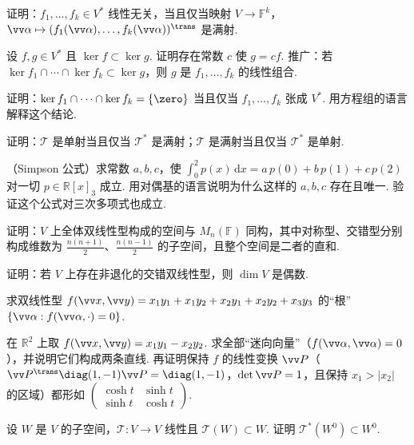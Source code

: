 {		\Bgroup
		\begin{exB}
			\item\label{ex:bil:B1} 证明：$f_1,\ldots,f_k\in V^*$ 线性无关，当且仅当映射 $V\to\mathbb{F}^k$，$\vv\alpha\mapsto(f_1(\vv\alpha),\ldots,f_k(\vv\alpha))^\trans$ 是满射.
			\item\label{ex:bil:B2} 设 $f,g\in V^*$ 且 $\ker f\subset\ker g$. 证明存在常数 $c$ 使 $g=cf$. 推广：若 $\ker f_1\cap\cdots\cap\ker f_k\subset\ker g$，则 $g$ 是 $f_1,\ldots,f_k$ 的线性组合.
			\item\label{ex:bil:B3} 证明：$\ker f_1\cap\cdots\cap\ker f_k=\{\zero\}$ 当且仅当 $f_1,\ldots,f_k$ 张成 $V^*$. 用方程组的语言解释这个结论.
			\item\label{ex:bil:B4} 证明：$\mathscr T$ 是单射当且仅当 $\mathscr T^*$ 是满射；$\mathscr T$ 是满射当且仅当 $\mathscr T^*$ 是单射.
			\item\label{ex:bil:B5} （Simpson 公式）求常数 $a,b,c$，使 $\int_0^2p(x)\,\mathrm dx=a\,p(0)+b\,p(1)+c\,p(2)$ 对一切 $p\in\mathbb{R}[x]_3$ 成立. 用对偶基的语言说明为什么这样的 $a,b,c$ 存在且唯一. 验证这个公式对三次多项式也成立.
			\item\label{ex:bil:B6} 证明：$V$ 上全体双线性型构成的空间与 $M_n(\mathbb{F})$ 同构，其中对称型、交错型分别构成维数为 $\frac{n(n+1)}2$、$\frac{n(n-1)}2$ 的子空间，且整个空间是二者的直和.
			\item\label{ex:bil:B7} 证明：若 $V$ 上存在非退化的交错双线性型，则 $\dim V$ 是偶数.
			\item\label{ex:bil:B8} 求双线性型 $f(\vv x,\vv y)=x_1y_1+x_1y_2+x_2y_1+x_2y_2+x_3y_3$ 的“根” $\{\vv\alpha:f(\vv\alpha,\cdot)=0\}$.
			\item\label{ex:bil:B9} 在 $\mathbb{R}^2$ 上取 $f(\vv x,\vv y)=x_1y_1-x_2y_2$. 求全部“迷向向量”（$f(\vv\alpha,\vv\alpha)=0$），并说明它们构成两条直线. 再证明保持 $f$ 的线性变换 $\vv P$（$\vv P^\trans\diag(1,-1)\vv P=\diag(1,-1)$，$\det\vv P=1$，且保持 $x_1>|x_2|$ 的区域）都形如 $\begin{pmatrix}\cosh t&\sinh t\\ \sinh t&\cosh t\end{pmatrix}$.
			\item\label{ex:bil:B10} 设 $W$ 是 $V$ 的子空间，$\mathscr T:V\to V$ 线性且 $\mathscr T(W)\subset W$. 证明 $\mathscr T^*(W^0)\subset W^0$.
		\end{exB}
		
}
